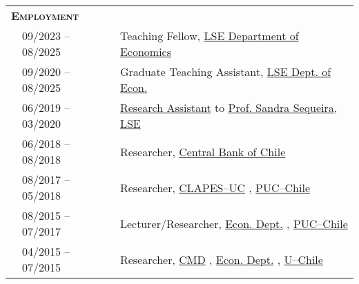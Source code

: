 \begin{tabular}{lll}
	
	\multicolumn{2}{l}{
		\large
		\textbf{%
			\textsc{%
				Employment
			}
		}
	}
	\\[2ex]
	
	  \indent
	& 09/2023 -- 08/2025
	& Teaching Fellow,
	\href{%
			https://www.lse.ac.uk/economics%
		}
		{LSE Department of Economics}
	\\
	
	& 09/2020 -- 08/2025
	& Graduate Teaching Assistant,
	\href{%
			https://www.lse.ac.uk/economics%
		}
		{LSE Dept. of Econ.}
	\\
	
	& 06/2019 -- 03/2020
	& 
		\href{%
			https://drive.google.com/file/d/1Nn5BeHOv2M4HhVNwtuzPtTAY8rVanidg/view%
		}
		{Research Assistant}
		to
		\href{%
			https://sites.google.com/view/sandramgsequeira/home%
		}
		{Prof. Sandra Sequeira},
		\href{%
			https://www.lse.ac.uk/%
		}
		{LSE}
	\\
	
	& 06/2018 -- 08/2018
	& Researcher,
		\href{%
			https://www.bcentral.cl/en/home%
		}
		{Central Bank of Chile}
	\\
	
	& 08/2017 -- 05/2018
	& Researcher,
		\href{%
			https://clapesuc.cl/%
		}
		{CLAPES--UC}%
		,
		\href{%
			https://www.uc.cl/en%
		}
		{PUC--Chile}
	\\
	
	& 08/2015 -- 07/2017
	& Lecturer/Researcher,
		\href{%
			https://economia.uc.cl/%
		}
		{Econ. Dept.}%
		,
		\href{%
			https://www.uc.cl/en%
		}
		{PUC--Chile}
	\\
	
	& 04/2015 -- 07/2015
	& Researcher,
		\href{%
			http://www.microdatos.cl/%
		}
		{CMD}%
		,
		\href{%
			https://econ.uchile.cl%
		}
		{Econ. Dept.}%
		,
		\href{%
			https://uchile.cl/english%
		}
		{U--Chile}
	\\
	
\end{tabular}